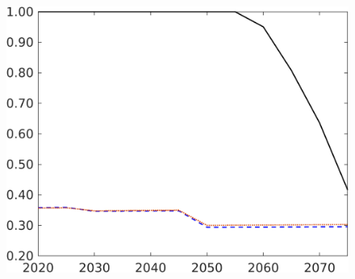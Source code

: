 \begin{figure}[h!!]
\begin{minipage}[]{0.32\textwidth}
\end{minipage}
\begin{minipage}[]{0.32\textwidth}
	\includegraphics[width=1\textwidth]{../../codding_model/own_basedOnFried/optimalPol_elastS_DisuSci/figures/all_1705/sn_CompEffOPT_T_NoTaus_spillover0_sep1_BN0_ineq0_etaa0.79_lgd0.png}
\end{minipage}


\end{figure}
